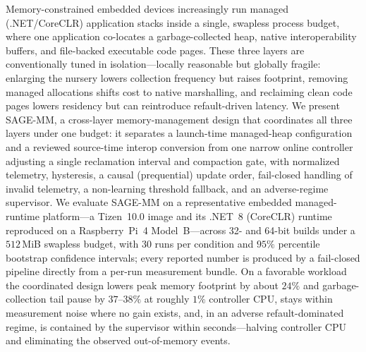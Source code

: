 Memory-constrained embedded devices increasingly run managed (.NET/CoreCLR)
application stacks inside a single, swapless process budget, where one
application co-locates a garbage-collected heap, native interoperability
buffers, and file-backed executable code pages. These three layers are
conventionally tuned in isolation---locally reasonable but globally fragile:
enlarging the nursery lowers collection frequency but raises footprint,
removing managed allocations shifts cost to native marshalling, and reclaiming
clean code pages lowers residency but can reintroduce refault-driven latency.
We present SAGE-MM, a cross-layer memory-management design that coordinates all
three layers under one budget: it separates a launch-time managed-heap
configuration and a reviewed source-time interop conversion from one narrow
online controller adjusting a single reclamation interval and compaction gate,
with normalized telemetry, hysteresis, a causal (prequential) update order,
fail-closed handling of invalid telemetry, a non-learning threshold fallback,
and an adverse-regime supervisor. We evaluate SAGE-MM on a representative
embedded managed-runtime platform---a Tizen~10.0 image and its .NET~8 (CoreCLR)
runtime reproduced on a Raspberry~Pi~4 Model~B---across 32- and 64-bit builds
under a $512$\,MiB swapless budget, with $30$ runs per condition and $95\%$
percentile bootstrap confidence intervals; every reported number is produced by
a fail-closed pipeline directly from a per-run measurement bundle. On a
favorable workload the coordinated design lowers peak memory footprint by about
$24\%$ and garbage-collection tail pause by $37$--$38\%$ at roughly $1\%$
controller CPU, stays within measurement noise where no gain exists, and, in an
adverse refault-dominated regime, is contained by the supervisor within
seconds---halving controller CPU and eliminating the observed out-of-memory
events.
